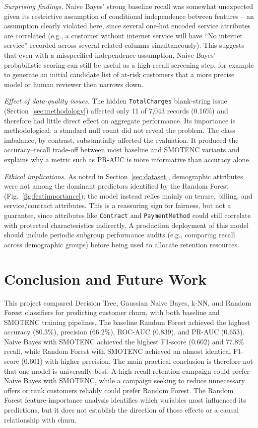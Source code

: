 \documentclass[conference]{IEEEtran}
\begin{document}
	\textit{Surprising findings.} Naive Bayes' strong baseline recall was somewhat unexpected given its restrictive assumption of conditional independence between features -- an assumption clearly violated here, since several one-hot encoded service attributes are correlated (e.g., a customer without internet service will have ``No internet service'' recorded across several related columns simultaneously). This suggests that even with a misspecified independence assumption, Naive Bayes' probabilistic scoring can still be useful as a high-recall screening step, for example to generate an initial candidate list of at-risk customers that a more precise model or human reviewer then narrows down.
	
	\textit{Effect of data-quality issues.} The hidden \texttt{TotalCharges} blank-string issue (Section~\ref{sec:methodology}) affected only 11 of 7{,}043 records (0.16\%) and therefore had little direct effect on aggregate performance. Its importance is methodological: a standard null count did not reveal the problem. The class imbalance, by contrast, substantially affected the evaluation. It produced the accuracy--recall trade-off between most baseline and SMOTENC variants and explains why a metric such as PR-AUC is more informative than accuracy alone.
	
	\textit{Ethical implications.} As noted in Section~\ref{sec:dataset}, demographic attributes were not among the dominant predictors identified by the Random Forest (Fig.~\ref{fig:featimportance}); the model instead relies mainly on tenure, billing, and service/contract attributes. This is a reassuring sign for fairness, but not a guarantee, since attributes like \texttt{Contract} and \texttt{PaymentMethod} could still correlate with protected characteristics indirectly. A production deployment of this model should include periodic subgroup performance audits (e.g., comparing recall across demographic groups) before being used to allocate retention resources.
	
	\section{Conclusion and Future Work}
	\label{sec:conclusion}
	
	This project compared Decision Tree, Gaussian Naive Bayes, k-NN, and Random Forest classifiers for predicting customer churn, with both baseline and SMOTENC training pipelines. The baseline Random Forest achieved the highest accuracy (80.3\%), precision (66.2\%), ROC-AUC (0.839), and PR-AUC (0.653). Naive Bayes with SMOTENC achieved the highest F1-score (0.602) and 77.8\% recall, while Random Forest with SMOTENC achieved an almost identical F1-score (0.601) with higher precision. The main practical conclusion is therefore not that one model is universally best. A high-recall retention campaign could prefer Naive Bayes with SMOTENC, while a campaign seeking to reduce unnecessary offers or rank customers reliably could prefer Random Forest. The Random Forest feature-importance analysis identifies which variables most influenced its predictions, but it does not establish the direction of those effects or a causal relationship with churn.
	
\end{document}
